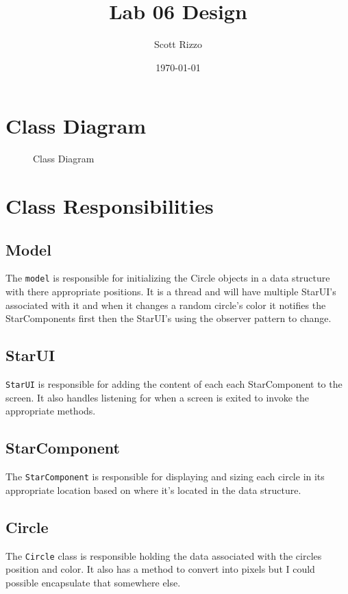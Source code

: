 \documentclass{article}
\title{Lab 06 Design}
\author{Scott Rizzo}
\date{\today}
\begin{document}
\maketitle

\section{Class Diagram}
\begin{figure}[H]
\caption{Class Diagram}
\label{fig:Hollow Star}
\end{figure}

\section{Class Responsibilities}
\subsection{Model}
The \texttt{model} is responsible for initializing the Circle objects in a data structure with there appropriate positions. It is a thread and will have multiple StarUI's associated with it and when it changes a random circle's color it notifies the StarComponents first then the StarUI's using the observer pattern to change.

\subsection{StarUI}
\texttt{StarUI} is responsible for adding the content of each each StarComponent to the screen. It also handles listening for when a screen is exited to invoke the appropriate methods.

\subsection{StarComponent}
The \texttt{StarComponent} is responsible for displaying and sizing each circle in its appropriate location based on where it's located in the data structure.

\subsection{Circle}
The \texttt{Circle} class is responsible holding the data associated with the circles position and color. It also has a method to convert into pixels but I could possible encapsulate that somewhere else.
\end{document}
